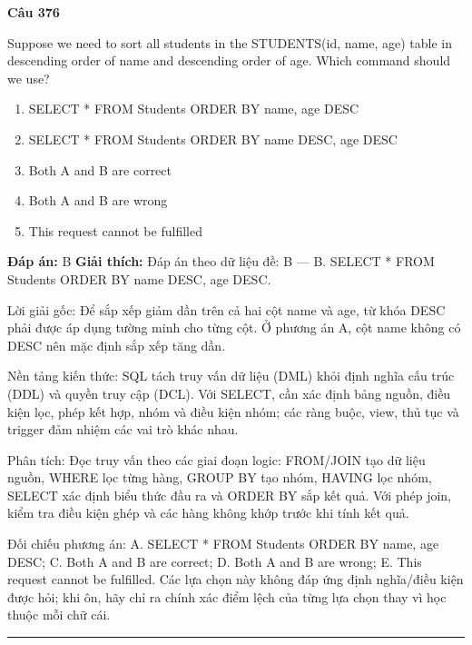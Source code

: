 \documentclass[11pt,a4paper]{article}
\newenvironment{question}[1]{%
  \par\vspace{1em}\noindent\textbf{\large Câu #1}\par\vspace{0.4em}
}{%
  \par\vspace{1em}\hrule\vspace{0.6em}
}
\newenvironment{choices}{%
  \begin{enumerate}[label=\textbf{\Alph*.},leftmargin=2.2em,itemsep=2pt,topsep=3pt]
}{%
  \end{enumerate}
}
\newcommand{\choice}{\item}
\begin{document}
\begin{question}{376}
Suppose we need to sort all students in the STUDENTS(id, name, age) table in descending order of name and descending order of age. Which command should we use?
\begin{choices}
\choice SELECT * FROM Students ORDER BY name, age DESC
\choice SELECT * FROM Students ORDER BY name DESC, age DESC
\choice Both A and B are correct
\choice Both A and B are wrong
\choice This request cannot be fulfilled
\end{choices}
\textbf{Đáp án:} B
\textbf{Giải thích:} Đáp án theo dữ liệu đề: B — B. SELECT * FROM Students ORDER BY name DESC, age DESC.

Lời giải gốc: Để sắp xếp giảm dần trên cả hai cột name và age, từ khóa DESC phải được áp dụng tường minh cho từng cột. Ở phương án A, cột name không có DESC nên mặc định sắp xếp tăng dần.

Nền tảng kiến thức: SQL tách truy vấn dữ liệu (DML) khỏi định nghĩa cấu trúc (DDL) và quyền truy cập (DCL). Với SELECT, cần xác định bảng nguồn, điều kiện lọc, phép kết hợp, nhóm và điều kiện nhóm; các ràng buộc, view, thủ tục và trigger đảm nhiệm các vai trò khác nhau.

Phân tích: Đọc truy vấn theo các giai đoạn logic: FROM/JOIN tạo dữ liệu nguồn, WHERE lọc từng hàng, GROUP BY tạo nhóm, HAVING lọc nhóm, SELECT xác định biểu thức đầu ra và ORDER BY sắp kết quả. Với phép join, kiểm tra điều kiện ghép và các hàng không khớp trước khi tính kết quả.

Đối chiếu phương án: A. SELECT * FROM Students ORDER BY name, age DESC; C. Both A and B are correct; D. Both A and B are wrong; E. This request cannot be fulfilled. Các lựa chọn này không đáp ứng định nghĩa/điều kiện được hỏi; khi ôn, hãy chỉ ra chính xác điểm lệch của từng lựa chọn thay vì học thuộc mỗi chữ cái.
\end{question}
\end{document}
